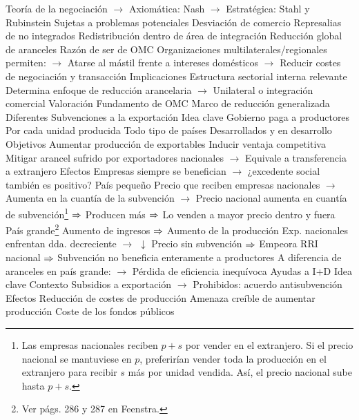 \documentclass{nuevotema}
\begin{document}
\begin{esquemal}
				\4 Teoría de la negociación
				\4[] $\to$ Axiomática: Nash
				\4[] $\to$ Estratégica: Stahl y Rubinstein
				\4 Sujetas a problemas potenciales
				\4[] Desviación de comercio
				\4[] Represalias de no integrados
				\4[] Redistribución dentro de área de integración
			\3 Reducción global de aranceles
				\4 Razón de ser de OMC
				\4 Organizaciones multilaterales/regionales permiten:
				\4[] $\to$ Atarse al mástil frente a intereses domésticos
				\4[] $\to$ Reducir costes de negociación y transacción
			\3 Implicaciones
				\4 Estructura sectorial interna relevante
				\4[] Determina enfoque de reducción arancelaria
				\4[] $\to$ Unilateral o integración comercial
			\3 Valoración
				\4 Fundamento de OMC
				\4[] Marco de reducción generalizada
				\4 Diferentes
	\1 
		\2 Subvenciones a la exportación
			\3 Idea clave
				\4 Gobierno paga a productores
				\4[] Por cada unidad producida
				\4 Todo tipo de países
				\4[] Desarrollados y en desarrollo
				\4 Objetivos
				\4[] Aumentar producción de exportables
				\4[] Inducir ventaja competitiva
				\4[] Mitigar arancel sufrido por exportadores nacionales
				\4[] $\to$ Equivale a transferencia a extranjero
			\3 Efectos
				\4 Empresas siempre se benefician
				\4[] $\to$ ¿excedente social también es positivo?
				\4 País pequeño
				\4[] Precio que reciben empresas nacionales
				\4[] $\to$ Aumenta en la cuantía de la subvención
				\4[] $\to$ Precio nacional aumenta en cuantía de subvención\footnote{Las empresas nacionales reciben $p+s$ por vender en el extranjero. Si el precio nacional se mantuviese en $p$, preferirían vender toda la producción en el extranjero para recibir $s$ más por unidad vendida. Así, el precio nacional sube hasta $p+s$.}
				\4[] $\Rightarrow$ Producen más
				\4[] $\Rightarrow$ Lo venden a mayor precio dentro y fuera
				\4[] 
				\4 País grande\footnote{Ver págs. 286 y 287 en Feenstra.}
				\4[] Aumento de ingresos
				\4[] $\Rightarrow$ Aumento de la producción
				\4[] Exp. nacionales enfrentan dda. decreciente
				\4[] $\to$ $\downarrow$ Precio sin subvención
				\4[] $\Rightarrow$ Empeora RRI nacional
				\4[] $\Rightarrow$ Subvención no beneficia enteramente a productores
				\4[] A diferencia de aranceles en país grande:
				\4[] $\to$ Pérdida de eficiencia inequívoca
		\2 Ayudas a I+D
			\3 Idea clave
				\4 Contexto
				\4[] Subsidios a exportación
				\4[] $\to$ Prohibidos: acuerdo antisubvención
			\3 Efectos
				\4 Reducción de costes de producción
				\4 Amenaza creíble de aumentar producción
				\4 Coste de los fondos públicos

\end{esquemal}
\end{document}
